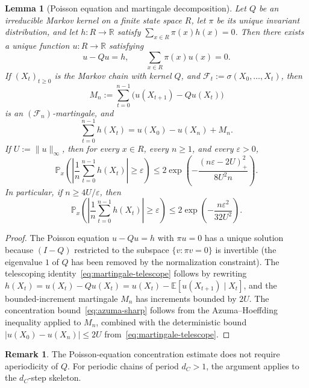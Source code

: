 \documentclass[12pt,a4paper]{article}
\newtheorem{lemma}[theorem]{Lemma}
\theoremstyle{definition}
\newtheorem{remark}[theorem]{Remark}
\newcommand{\eps}{\varepsilon}
\newcommand{\R}{\mathbb{R}}
\begin{document}
\begin{lemma}[Poisson equation and martingale decomposition]\label{lem:poisson}
Let $Q$ be an irreducible Markov kernel on a finite state space $R$, let $\pi$ be its unique invariant distribution, and let $h \colon R \to \R$ satisfy $\sum_{x \in R} \pi(x) h(x) = 0$. Then there exists a unique function $u \colon R \to \R$ satisfying
\begin{equation}\label{eq:poisson}
u - Qu = h, \qquad \sum_{x \in R} \pi(x) u(x) = 0.
\end{equation}
If $(X_t)_{t \geq 0}$ is the Markov chain with kernel $Q$, and $\mathcal{F}_t := \sigma(X_0, \ldots, X_t)$, then
\[
M_n := \sum_{t=0}^{n-1} \bigl(u(X_{t+1}) - Qu(X_t)\bigr)
\]
is an $(\mathcal{F}_n)$-martingale, and
\begin{equation}\label{eq:martingale-telescope}
\sum_{t=0}^{n-1} h(X_t) = u(X_0) - u(X_n) + M_n.
\end{equation}
If $U := \|u\|_\infty$, then for every $x \in R$, every $n \geq 1$, and every $\eps > 0$,
\begin{equation}\label{eq:azuma-sharp}
\mathbb{P}_x\!\left(\left|\frac{1}{n}\sum_{t=0}^{n-1} h(X_t)\right| \geq \eps\right) \leq 2\exp\!\left(-\frac{(n\eps - 2U)_+^2}{8U^2 n}\right).
\end{equation}
In particular, if $n \geq 4U/\eps$, then
\begin{equation}\label{eq:azuma-simple}
\mathbb{P}_x\!\left(\left|\frac{1}{n}\sum_{t=0}^{n-1} h(X_t)\right| \geq \eps\right) \leq 2\exp\!\left(-\frac{n\eps^2}{32U^2}\right).
\end{equation}
\end{lemma}

\begin{proof}
The Poisson equation $u - Qu = h$ with $\pi u = 0$ has a unique solution because $(I - Q)$ restricted to the subspace $\{v : \pi v = 0\}$ is invertible (the eigenvalue $1$ of $Q$ has been removed by the normalization constraint).  The telescoping identity~\eqref{eq:martingale-telescope} follows by rewriting $h(X_t) = u(X_t) - Qu(X_t) = u(X_t) - \mathbb{E}[u(X_{t+1}) \mid X_t]$, and the bounded-increment martingale $M_n$ has increments bounded by $2U$. The concentration bound~\eqref{eq:azuma-sharp} follows from the Azuma--Hoeffding inequality applied to $M_n$, combined with the deterministic bound $|u(X_0) - u(X_n)| \leq 2U$ from~\eqref{eq:martingale-telescope}.
\end{proof}

\begin{remark}
The Poisson-equation concentration estimate does not require aperiodicity of $Q$. For periodic chains of period $d_C > 1$, the argument applies to the $d_C$-step skeleton.
\end{remark}
\end{document}
